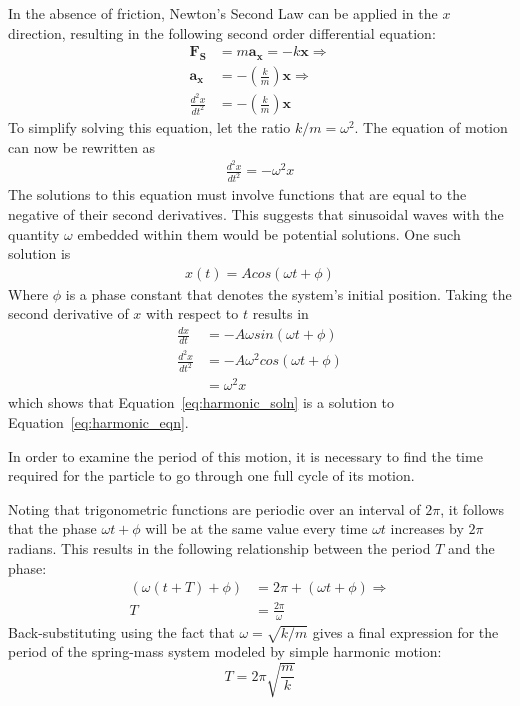 \documentclass[twocolumn,english]{IEEEtran}
\theoremstyle{plain}
\theoremstyle{plain}
\begin{document}
  In the absence of friction, Newton's Second Law can be applied in the $x$ direction, resulting in the following second order differential equation:
  \begin{align*}
   \mathbf{F_S} &= m\mathbf{a_x} = -k \mathbf{x} \Rightarrow \\
   \mathbf{a_x} &= -\left(\frac{k}{m}\right)\mathbf{x} \Rightarrow \\
   \frac{d^2 x}{dt^2} &= -\left(\frac{k}{m}\right)\mathbf{x}
  \end{align*}
  To simplify solving this equation, let the ratio $k/m = \omega^2$. The equation of motion can now be rewritten as
  \begin{align}\label{eq:harmonic_eqn}
   \frac{d^2 x}{dt^2} = -\omega^2 x
  \end{align}
  The solutions to this equation must involve functions that are equal to the negative of their second derivatives. This suggests that sinusoidal waves with the quantity $\omega$ embedded within them would be potential solutions. One such solution is
  \begin{align}\label{eq:harmonic_soln}
   x(t) = Acos(\omega t + \phi)
  \end{align}
  Where $\phi$ is a phase constant that denotes the system's initial position. Taking the second derivative of $x$ with respect to $t$ results in
  \begin{align*}
   \frac{dx}{dt} &= -A\omega sin(\omega t + \phi) \\
   \frac{d^2x}{dt^2} &= -A \omega^2 cos(\omega t + \phi) \\
		    &= \omega^2 x
  \end{align*}
  which shows that Equation~\ref{eq:harmonic_soln} is a solution to Equation~\ref{eq:harmonic_eqn}.

  In order to examine the period of this motion, it is necessary to find the time required for the particle to go through one full cycle of its motion.

  Noting that trigonometric functions are periodic over an interval of $2\pi$, it follows that the phase $\omega t+\phi$ will be at the same value every time $\omega t$ increases by $2\pi$ radians. This results in the following relationship between the period $T$ and the phase:
  \begin{align*}
   (\omega(t+T) + \phi) &= 2\pi + (\omega t + \phi) \Rightarrow \\
   T &= \frac{2\pi}{\omega}
  \end{align*}
  Back-substituting using the fact that $\omega = \sqrt{k/m}$ gives a final expression for the period of the spring-mass system modeled by simple harmonic motion:
  \begin{equation}
   T = 2\pi \sqrt{\frac{m}{k}}
  \end{equation}
\end{document}
